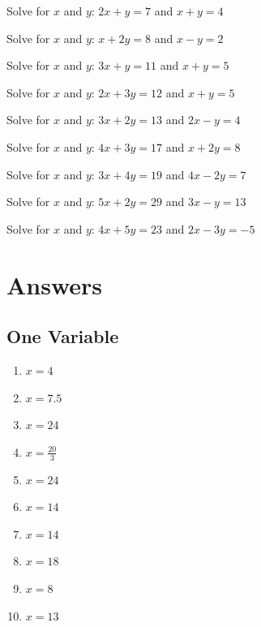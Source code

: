 \documentclass{article}
\theoremstyle{mytheoremstyle}
\theoremstyle{mytheoremstyle}
\theoremstyle{myproblemstyle}
\begin{document}
        \begin{problem}
        Solve for $x$ and $y$: $2x + y = 7$ and $x + y = 4$
        \end{problem}

        \begin{problem}
        Solve for $x$ and $y$: $x + 2y = 8$ and $x - y = 2$
        \end{problem}

        \begin{problem}
        Solve for $x$ and $y$: $3x + y = 11$ and $x + y = 5$
        \end{problem}

        \begin{problem}
        Solve for $x$ and $y$: $2x + 3y = 12$ and $x + y = 5$
        \end{problem}

        \begin{problem}
        Solve for $x$ and $y$: $3x + 2y = 13$ and $2x - y = 4$
        \end{problem}

        \begin{problem}
        Solve for $x$ and $y$: $4x + 3y = 17$ and $x + 2y = 8$
        \end{problem}

        \begin{problem}
        Solve for $x$ and $y$: $3x + 4y = 19$ and $4x - 2y = 7$
        \end{problem}

        \begin{problem}
        Solve for $x$ and $y$: $5x + 2y = 29$ and $3x - y = 13$
        \end{problem}

        \begin{problem}
        Solve for $x$ and $y$: $4x + 5y = 23$ and $2x - 3y = -5$
        \end{problem}

        \pagebreak

        \section{Answers}

        \subsection{One Variable}
        \begin{enumerate}
            \item $x = 4$
            \item $x = 7.5$
            \item $x = 24$
            \item $x = \frac{20}{3}$
            \item $x = 24$
            \item $x = 14$
            \item $x = 14$
            \item $x = 18$
            \item $x = 8$
            \item $x = 13$
        \end{enumerate}
\end{document}
